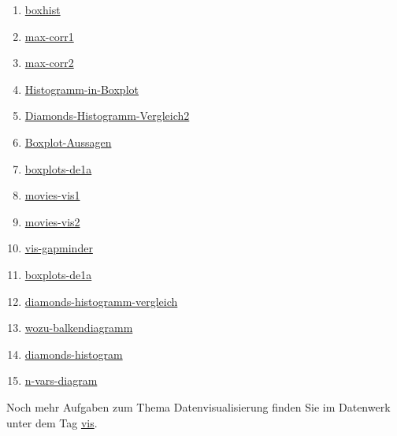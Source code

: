 \documentclass[
  letterpaper,
]{scrbook}
\providecommand{\tightlist}{%
  \setlength{\itemsep}{0pt}\setlength{\parskip}{0pt}}\usepackage{longtable,booktabs,array}
\theoremstyle{definition}
\theoremstyle{definition}
\theoremstyle{definition}
\theoremstyle{remark}
\begin{document}
\begin{enumerate}
\def\labelenumi{\arabic{enumi}.}
\tightlist
\item
  \href{https://sebastiansauer.github.io/Datenwerk/posts/boxhist/boxhist.html}{boxhist}
\item
  \href{https://sebastiansauer.github.io/Datenwerk/posts/max-corr1/max-corr1.html}{max-corr1}
\item
  \href{https://sebastiansauer.github.io/Datenwerk/posts/max-corr2/max-corr2.html}{max-corr2}
\item
  \href{https://sebastiansauer.github.io/Datenwerk/posts/histogramm-in-boxplot/histogramm-in-boxplot}{Histogramm-in-Boxplot}
\item
  \href{https://sebastiansauer.github.io/Datenwerk/posts/diamonds-histogramm-vergleich2/diamonds-histogramm-vergleich2}{Diamonds-Histogramm-Vergleich2}
\item
  \href{https://sebastiansauer.github.io/Datenwerk/posts/boxplot-aussagen/boxplot-aussagen}{Boxplot-Aussagen}
\item
  \href{https://sebastiansauer.github.io/Datenwerk/posts/boxplots-de1a/boxplots-de1a.html}{boxplots-de1a}
\item
  \href{https://sebastiansauer.github.io/Datenwerk/posts/movies-vis1/movies-vis1.html}{movies-vis1}
\item
  \href{https://sebastiansauer.github.io/Datenwerk/posts/movies-vis2/movies-vis2.html}{movies-vis2}
\item
  \href{https://sebastiansauer.github.io/Datenwerk/posts/vis-gapminder/vis-gapminder}{vis-gapminder}
\item
  \href{https://sebastiansauer.github.io/Datenwerk/posts/boxplots-de1a/boxplots-de1a}{boxplots-de1a}
\item
  \href{https://sebastiansauer.github.io/Datenwerk/posts/diamonds-histogramm-vergleich/diamonds-histogramm-vergleich}{diamonds-histogramm-vergleich}
\item
  \href{https://sebastiansauer.github.io/Datenwerk/posts/wozu-balkendiagramm/wozu-balkendiagramm}{wozu-balkendiagramm}
\item
  \href{https://sebastiansauer.github.io/Datenwerk/posts/diamonds-histogram/diamonds-histogram}{diamonds-histogram}
\item
  \href{https://sebastiansauer.github.io/Datenwerk/posts/n-vars-diagram/n-vars-diagram}{n-vars-diagram}
\end{enumerate}

Noch mehr Aufgaben zum Thema Datenvisualisierung finden Sie im Datenwerk
unter dem Tag
\href{https://sebastiansauer.github.io/Datenwerk/\#category=vis}{vis}.
\end{document}
